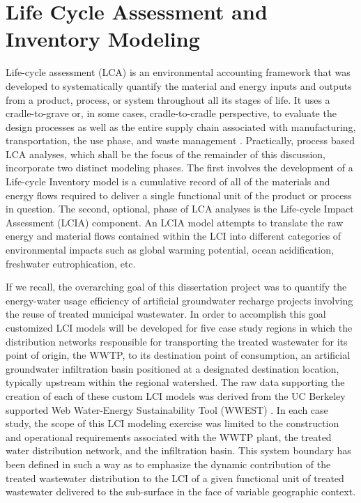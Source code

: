 \section{Life Cycle Assessment and Inventory Modeling}

Life-cycle assessment (LCA) is an environmental accounting framework that was developed to systematically quantify the material and energy inputs and outputs from a product, process, or system throughout all its stages of life. It uses a cradle-to-grave or, in some cases, cradle-to-cradle perspective, to evaluate the design processes as well as the entire supply chain associated with manufacturing, transportation, the use phase, and waste management \cite{Rebitzer2004, Pennington2004}. Practically, process based LCA analyses, which shall be the focus of the remainder of this discussion, incorporate two distinct modeling phases. The first involves the development of a Life-cycle Inventory model is a cumulative record of all of the materials and energy flows required to deliver a single functional unit of the product or process in question. The second, optional, phase of LCA analyses is the Life-cycle Impact Assessment (LCIA) component. An LCIA model attempts to translate the raw energy and material flows contained within the LCI into different categories of environmental impacts such as global warming potential, ocean acidification, freshwater eutrophication, etc. 

If we recall, the overarching goal of this dissertation project was to quantify the energy-water usage efficiency of artificial groundwater recharge projects involving the reuse of treated municipal wastewater. In order to accomplish this goal customized LCI models will be developed for five case study regions in which the distribution networks responsible for transporting the treated wastewater for its point of origin, the WWTP, to its destination point of consumption, an artificial groundwater infiltration basin positioned at a designated destination location, typically upstream within the regional watershed. The raw data supporting the creation of each of these custom LCI models was derived from the UC Berkeley supported Web Water-Energy Sustainability Tool (WWEST) \cite{Stokes2006}. In each case study, the scope of this LCI modeling exercise was limited to the construction and operational requirements associated with the WWTP plant, the treated water distribution network, and the infiltration basin. This system boundary has been defined in such a way as to emphasize the dynamic contribution of the treated wastewater distribution to the LCI of a given functional unit of treated wastewater delivered to the sub-surface in the face of variable geographic context.


